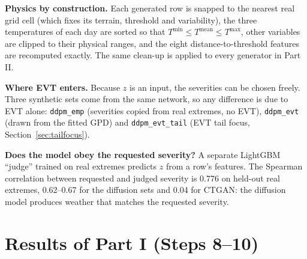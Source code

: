 \documentclass[11pt,a4paper]{article}
\begin{document}
\textbf{Physics by construction.} Each generated row is snapped to the nearest real grid cell (which fixes
its terrain, threshold and variability), the three temperatures of each day are sorted so that
$T^{\min}\le T^{\text{mean}}\le T^{\max}$, other variables are clipped to their physical ranges, and the
eight distance-to-threshold features are recomputed exactly. The same clean-up is applied to every
generator in Part II.

\textbf{Where EVT enters.} Because $z$ is an input, the severities can be chosen freely. Three synthetic sets
come from the same network, so any difference is due to EVT alone: \texttt{ddpm\_emp} (severities copied from
real extremes, no EVT), \texttt{ddpm\_evt} (drawn from the fitted GPD) and \texttt{ddpm\_evt\_tail} (EVT tail
focus, Section~\ref{sec:tailfocus}).

\textbf{Does the model obey the requested severity?} A separate LightGBM ``judge'' trained on real extremes
predicts $z$ from a row's features. The Spearman correlation between requested and judged severity is 0.776
on held-out real extremes, 0.62--0.67 for the diffusion sets and 0.04 for CTGAN: the diffusion model
produces weather that matches the requested severity.

\section{Results of Part I (Steps 8--10)}\label{sec:results}
\end{document}

